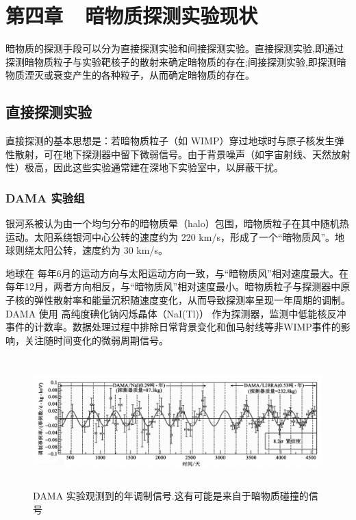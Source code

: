 \section*{第四章~~暗物质探测实验现状}

\setcounter{section}{4} \setcounter{subsection}{0}
\setcounter{table}{0} \setcounter{figure}{0} \setcounter{equation}{0}


暗物质的探测手段可以分为直接探测实验和间接探测实验。直接探测实验,即通过探测暗物质粒子与实验靶核子的散射来确定暗物质的存在;间接探测实验,即探测暗物质湮灭或衰变产生的各种粒子，从而确定暗物质的存在。

\subsection{直接探测实验}

直接探测的基本思想是：若暗物质粒子（如 WIMP）穿过地球时与原子核发生弹性散射，可在地下探测器中留下微弱信号。由于背景噪声（如宇宙射线、天然放射性）极高，因此这些实验通常建在深地下实验室中，以屏蔽干扰。

\subsubsection{DAMA 实验组}

银河系被认为由一个均匀分布的暗物质晕（halo）包围，暗物质粒子在其中随机热运动。太阳系绕银河中心公转的速度约为 220 km/s，形成了一个“暗物质风”。地球则绕太阳公转，速度约为 30 km/s。

地球在 每年6月的运动方向与太阳运动方向一致，与“暗物质风”相对速度最大。在 每年12月，两者方向相反，与“暗物质风”相对速度最小。暗物质粒子与探测器中原子核的弹性散射率和能量沉积随速度变化，从而导致探测率呈现一年周期的调制。DAMA 使用 高纯度碘化钠闪烁晶体（NaI(Tl)） 作为探测器，监测中低能核反冲事件的计数率。数据处理过程中排除日常背景变化和伽马射线等非WIMP事件的影响，关注随时间变化的微弱周期信号。

\begin{figure}[!htbp]
    \centering    
    \includegraphics[height=5cm]{Img/4-1.png}
    \caption{DAMA 实验观测到的年调制信号.这有可能是来自于暗物质碰撞的信号 }
    \label{4-1}
\end{figure}

